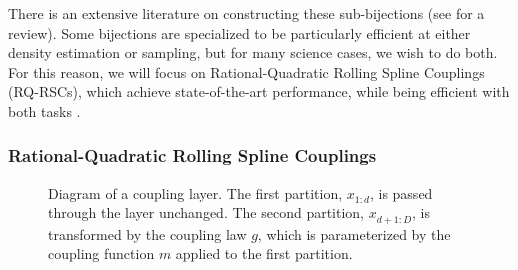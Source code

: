 \documentclass[twocolumn]{aastex631}
\begin{document}
There is an extensive literature on constructing these sub-bijections (see \citealt{kobyzev2020} for a review).
Some bijections are specialized to be particularly efficient at either density estimation or sampling, but for many science cases, we wish to do both.
For this reason, we will focus on Rational-Quadratic Rolling Spline Couplings (RQ-RSCs), which achieve state-of-the-art performance, while being efficient with both tasks \citep{durkan2019}.

\subsubsection{Rational-Quadratic Rolling Spline Couplings}
\label{sec:rq-rsc}

\begin{figure}
    \centering
    \caption{
    Diagram of a coupling layer.
    The first partition, $x^{}_{1:d}$, is passed through the layer unchanged.
    The second partition, $x^{}_{d+1:D}$, is transformed by the coupling law $g$, which is parameterized by the coupling function $m$ applied to the first partition.
    }
    \label{fig:coupling}
\end{figure}
\end{document}
